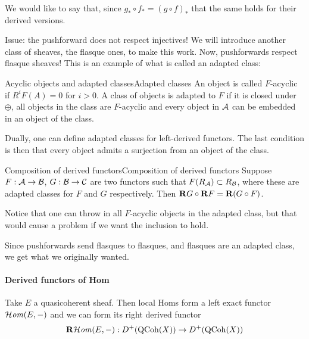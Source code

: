 We would like to say that, since $g_*\circ f_*=(g\circ f)_*$ that the same holds for their derived versions.

Issue: the pushforward does not respect injectives! We will introduce another class of sheaves, the flasque ones, to make this work. Now, pushforwards respect flasque sheaves! This is an example of what is called an adapted class:

\begin{definition}{Acyclic objects and adapted classes}{Adapted classes}
     An object is called $F$-acyclic if $R^iF(A)=0$ for $i>0$. A class of objects is adapted to $F$ if it is closed under $\oplus$, all objects in the class are $F$-acyclic and every object in $\mathcal{A}$ can be embedded in an object of the class.
\end{definition}

\begin{remark}{}{}
    Dually, one can define adapted classes for left-derived functors. The last condition is then that every object admits a surjection from an object of the class.
\end{remark}

\begin{theorem}{Composition of derived functors}{Composition of derived functors}
    Suppose $F:\mathcal{A}\to\mathcal{B}$, $G:\mathcal{B}\to\mathcal{C}$ are two functors such that $F(R_{\mathcal{A}})\subset R_{\mathcal{B}}$, where these are adapted classes for $F$ and $G$ respectively. Then $\mathbf{R} G\circ\mathbf{R} F = \mathbf{R}(G\circ F)$.
\end{theorem}

Notice that one can throw in all $F$-acyclic objects in the adapted class, but that would cause a problem if we want the inclusion to hold.

Since pushforwards send flasques to flasques, and flasques are an adapted class, we get what we originally wanted.

\paragraph{Derived functors of Hom}

Take $E$ a quasicoherent sheaf. Then local Homs form a left exact functor $\operatorname{\mathcal{H}\mathit{om}}(E,-)$ and we can form its right derived functor
\begin{equation*}
    \operatorname{\mathbf{R}\mathcal{H}\mathit{om}}(E,-):D^+(\operatorname{QCoh}(X))\to D^+(\operatorname{QCoh}(X))
\end{equation*}


